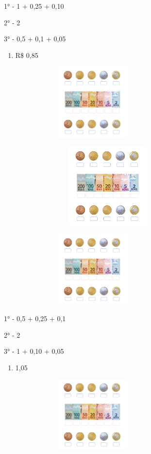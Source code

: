 1° - 1 + 0,25 + 0,10

2° - 2

3° - 0,5 + 0,1 + 0,05

\begin{enumerate}
\def\labelenumi{\alph{enumi})}
\item
  R\$ 0,85
\end{enumerate}

\includegraphics[width=3.80208in,height=1.51291in]{media/image73.png}

\includegraphics[width=4.45833in,height=1.68116in]{media/image72.png}

\includegraphics[width=3.80208in,height=1.51291in]{media/image73.png}

1° - 0,5 + 0,25 + 0,1

2° - 2

3° - 1 + 0,10 + 0,05

\begin{enumerate}
\def\labelenumi{\alph{enumi})}
\item
  1,05
\end{enumerate}

\includegraphics[width=3.80208in,height=1.51291in]{media/image73.png}

